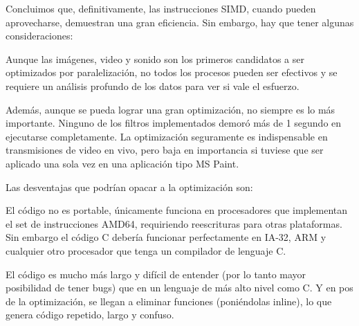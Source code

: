 \documentclass[a4paper,10pt,twoside]{article}
\begin{document}
Concluimos que, definitivamente, las instrucciones SIMD, cuando pueden aprovecharse, demuestran una gran eficiencia. Sin embargo, hay que tener algunas consideraciones:

Aunque las imágenes, video y sonido son los primeros candidatos a ser optimizados por paralelización, no todos los procesos pueden ser efectivos y se requiere un análisis profundo de los datos para ver si vale el esfuerzo.

Además, aunque se pueda lograr una gran optimización, no siempre es lo más importante. Ninguno de los filtros implementados demoró más de 1 segundo en ejecutarse completamente. La optimización seguramente es indispensable en transmisiones de video en vivo, pero baja en importancia si tuviese que ser aplicado una sola vez en una aplicación tipo MS Paint.

Las desventajas que podrían opacar a la optimización son:

El código no es portable, únicamente funciona en procesadores que implementan el set de instrucciones AMD64, requiriendo reescrituras para otras plataformas. Sin embargo el código C debería funcionar perfectamente en IA-32, ARM y cualquier otro procesador que tenga un compilador de lenguaje C.

El código es mucho más largo y difícil de entender (por lo tanto mayor posibilidad de tener bugs) que en un lenguaje de más alto nivel como C. Y en pos de la optimización, se llegan a eliminar funciones (poniéndolas inline), lo que genera código repetido, largo y confuso.
\end{document}
